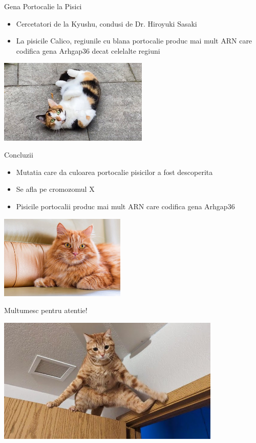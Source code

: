 \documentclass{beamer}
\begin{document}
\begin{frame}{Gena Portocalie la Pisici}
    \begin{itemize}
        \item Cercetatori de la Kyushu, condusi de Dr. Hiroyuki Sasaki
        \item La pisicile Calico, regiunile cu blana portocalie produc mai mult ARN care codifica gena Arhgap36 decat celelalte regiuni
    \end{itemize}
    \centering
    \begin{minipage}{0.6\textwidth}
        \centering
        \includegraphics[height=4cm]{maxresdefault.jpg}
    \end{minipage}
\end{frame}

\begin{frame}{Concluzii}
    \begin{itemize}
        \item Mutatia care da culoarea portocalie pisicilor a fost descoperita
        \item Se afla pe cromozomul X
        \item Pisicile portocalii produc mai mult ARN care codifica gena Arhgap36   
    \end{itemize}
    \centering
    \begin{minipage}{0.5\textwidth}
        \centering
        \includegraphics[height=4cm]{orange-cat.jpg}
    \end{minipage}
\end{frame}

\begin{frame}
    \centering
    \Huge Multumesc pentru atentie!
    \centering
    \begin{minipage}{1\textwidth}
        \centering
        \includegraphics[height=6cm]{hq720.jpg}
    \end{minipage}
\end{frame}
\end{document}
